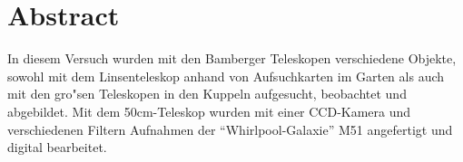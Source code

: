 \section{Abstract}
In diesem Versuch wurden mit den Bamberger Teleskopen verschiedene Objekte, sowohl mit dem Linsenteleskop anhand von Aufsuchkarten im Garten als auch mit den gro"sen Teleskopen in den Kuppeln aufgesucht, beobachtet und abgebildet. Mit dem 50cm-Teleskop wurden mit einer CCD-Kamera und verschiedenen Filtern Aufnahmen der \enquote{Whirlpool-Galaxie} M51 angefertigt und digital bearbeitet. 